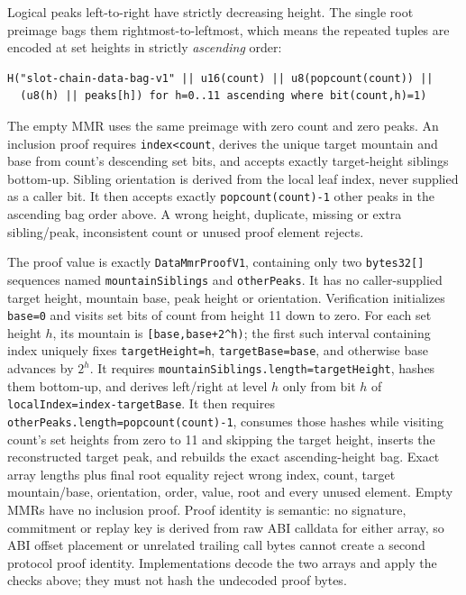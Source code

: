 \documentclass[a4paper,11pt]{article}
\newcommand{\code}[1]{\nolinkurl{#1}}
\begin{document}
Logical peaks left-to-right have strictly decreasing height.  The single root
preimage bags them rightmost-to-leftmost, which means the repeated tuples are
encoded at set heights in strictly \emph{ascending} order:
\begin{verbatim}
H("slot-chain-data-bag-v1" || u16(count) || u8(popcount(count)) ||
  (u8(h) || peaks[h]) for h=0..11 ascending where bit(count,h)=1)
\end{verbatim}
The empty MMR uses the same preimage with zero count and zero peaks.  An
inclusion proof requires \code{index<count}, derives the unique target mountain
and base from count's descending set bits, and accepts exactly target-height
siblings bottom-up.  Sibling orientation is derived from the local leaf index,
never supplied as a caller bit.  It then accepts exactly
\code{popcount(count)-1} other peaks in the ascending bag order above.  A wrong
height, duplicate, missing or extra sibling/peak, inconsistent count or unused
proof element rejects.

The proof value is exactly \code{DataMmrProofV1}, containing only two
\code{bytes32[]} sequences named \code{mountainSiblings} and
\code{otherPeaks}.  It has no caller-supplied target height, mountain base, peak
height or orientation.  Verification initializes \code{base=0} and visits set
bits of count from height 11 down to zero.  For each set height $h$, its mountain
is \code{[base,base+2^h)}; the first such interval containing index uniquely
fixes \code{targetHeight=h}, \code{targetBase=base}, and otherwise base advances
by $2^h$.  It requires
\code{mountainSiblings.length=targetHeight}, hashes them bottom-up, and derives
left/right at level $h$ only from bit $h$ of
\code{localIndex=index-targetBase}.  It then requires
\code{otherPeaks.length=popcount(count)-1}, consumes those hashes while visiting
count's set heights from zero to 11 and skipping the target height, inserts the
reconstructed target peak, and rebuilds the exact ascending-height bag.  Exact
array lengths plus final root equality reject wrong index, count, target
mountain/base, orientation, order, value, root and every unused element.  Empty
MMRs have no inclusion proof.  Proof identity is semantic: no signature,
commitment or replay key is derived from raw ABI calldata for either array, so
ABI offset placement or unrelated trailing call bytes cannot create a second
protocol proof identity.  Implementations decode the two arrays and apply the
checks above; they must not hash the undecoded proof bytes.
\end{document}
